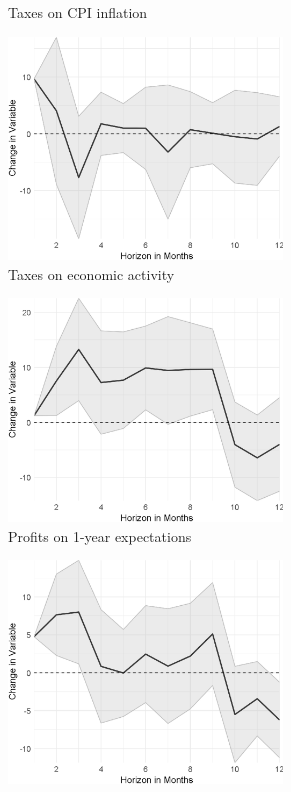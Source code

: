 \begin{figure}
\begin{subfigure}{00.24\textwidth}
		\caption{Taxes on CPI inflation}
	\end{subfigure}
	\begin{subfigure}{00.24\textwidth}
		\includegraphics[width=0.8\textwidth]{output/lp/baseline/bHP/taxes/taxesoneconac_djn.eps}
		\caption{Taxes on economic activity}
	\end{subfigure}
	\begin{subfigure}{00.24\textwidth}
		\includegraphics[width=0.8\textwidth]{output/lp/baseline/bHP/profits/profitsonexpectations1y_djn.eps}
		\caption{Profits on 1-year expectations}
	\end{subfigure}
	\begin{subfigure}{00.24\textwidth}
		\includegraphics[width=0.8\textwidth]{output/lp/baseline/bHP/profits/profitsonexpectations3y_djn.eps}

\end{subfigure}
\end{figure}
